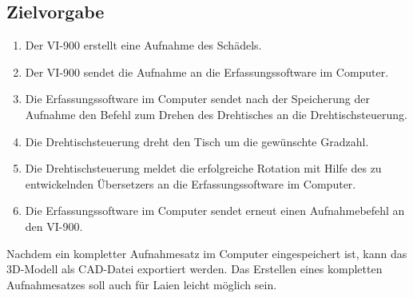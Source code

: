 \subsection{Zielvorgabe}
\begin{enumerate}
\item Der VI-900 erstellt eine Aufnahme des Schädels.
\item Der VI-900 sendet die Aufnahme an die Erfassungssoftware im Computer.
\item Die Erfassungssoftware im Computer sendet nach der Speicherung der Aufnahme den Befehl zum Drehen des Drehtisches an die Drehtischsteuerung.
\item Die Drehtischsteuerung dreht den Tisch um die gewünschte Gradzahl.
\item Die Drehtischsteuerung meldet die erfolgreiche Rotation mit Hilfe des zu entwickelnden Übersetzers an die Erfassungssoftware im Computer.
\item Die Erfassungssoftware im Computer sendet erneut einen Aufnahmebefehl an den VI-900.
\end{enumerate}
Nachdem ein kompletter Aufnahmesatz im Computer eingespeichert ist, kann das 3D-Modell als CAD-Datei exportiert werden.
Das Erstellen eines kompletten Aufnahmesatzes soll auch für Laien leicht möglich sein.

